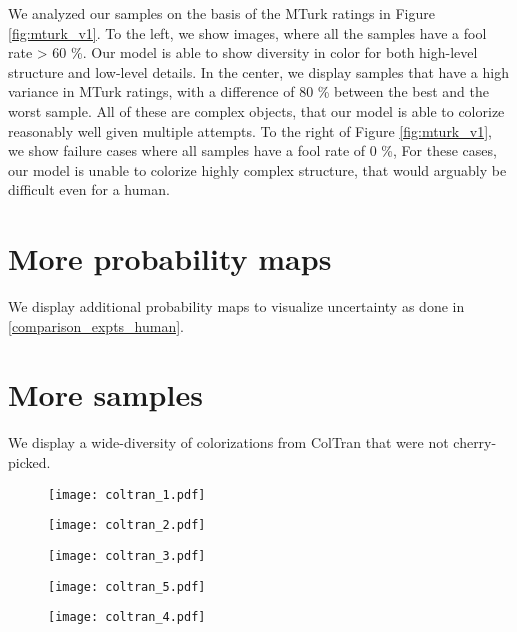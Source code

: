 \documentclass{article} \usepackage{iclr2021_conference,times}
\begin{document}
We analyzed our samples on the basis of the MTurk ratings in Figure \ref{fig:mturk_v1}. To the left, we show images, where all the samples have a fool rate > 60 \%. Our model is able to show diversity in color for both high-level structure and low-level details. In the center, we display samples that have a high variance in MTurk ratings, with a difference of 80 \% between the best and the worst sample. All of these are complex objects, that our model is able to colorize reasonably well given multiple attempts. To the right of Figure \ref{fig:mturk_v1}, we show failure cases where all samples have a fool rate of 0 \%, For these cases, our model is unable to colorize highly complex structure, that would arguably be difficult even for a human.


\section{More probability maps}




We display additional probability maps to visualize uncertainty as done in \ref{comparison_expts_human}.


\section{More samples}

We display a wide-diversity of colorizations from ColTran that were not cherry-picked.
\begin{figure}[htp]
\centering
\setlength{\lineskip}{0pt}

  \texttt{[image: coltran\_1.pdf]}
\end{figure}

\begin{figure}[htp]
\centering
\setlength{\lineskip}{0pt}

  \texttt{[image: coltran\_2.pdf]}
\end{figure}

\begin{figure}[htp]
\centering
\setlength{\lineskip}{0pt}

  \texttt{[image: coltran\_3.pdf]}
\end{figure}

\begin{figure}[htp]
\centering
\setlength{\lineskip}{0pt}

  \texttt{[image: coltran\_5.pdf]}
\end{figure}

\begin{figure}[htp]
\centering
\setlength{\lineskip}{0pt}

  \texttt{[image: coltran\_4.pdf]}
\end{figure}
\end{document}
